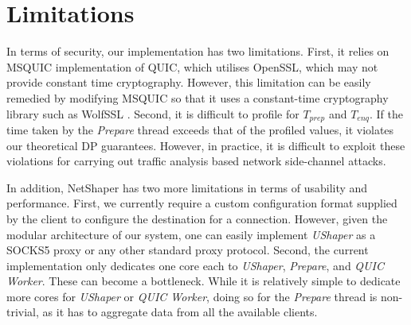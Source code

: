 \section{Limitations}
\label{sec:netshaper-limitations}

In terms of security, our implementation has two limitations.
First, it relies on MSQUIC implementation of QUIC, which utilises OpenSSL, which may not provide constant time cryptography.
However, this limitation can be easily remedied by modifying MSQUIC so that it uses a constant-time cryptography library such as WolfSSL \cite{wolfssl}.
Second, it is difficult to profile for $T_{prep}$ and $T_{enq}$. 
If the time taken by the \textit{Prepare} thread exceeds that of the profiled values, it violates our theoretical DP guarantees. 
However, in practice, it is difficult to exploit these violations for carrying out traffic analysis based network side-channel attacks.

In addition, NetShaper has two more limitations in terms of usability and performance.
First, we currently require a custom configuration format supplied by the client to configure the destination for a connection. 
However, given the modular architecture of our system, one can easily implement \textit{UShaper} as a SOCKS5 proxy \cite{leech1996socks} or any other standard proxy protocol.
Second, the current implementation only dedicates one core each to \textit{UShaper}, \textit{Prepare}, and \textit{QUIC Worker}. These can become a bottleneck. 
While it is relatively simple to dedicate more cores for \textit{UShaper} or \textit{QUIC Worker}, doing so for the \textit{Prepare} thread is non-trivial, as it has to aggregate data from all the available clients.